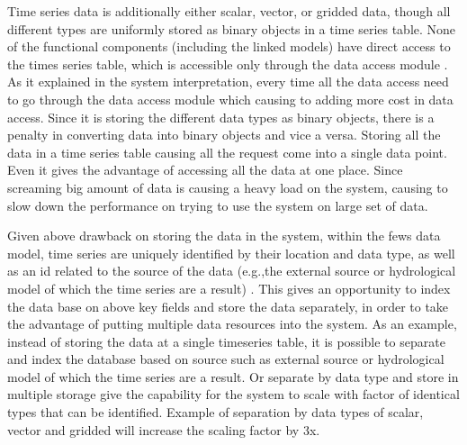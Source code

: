 Time series data is additionally either scalar, vector, or gridded data, though all different types are uniformly stored as binary objects in a time series table. None of the functional components (including the linked models) have direct access to the times series table, which is accessible only through the data access module \cite{Werner2013TheSystem}. As it explained in the system interpretation, every time all the data access need to go through the data access module which causing to adding more cost in data access. Since it is storing the different data types as binary objects, there is a penalty in converting data into binary objects and vice a versa. Storing all the data in a time series table causing all the request come into a single data point. Even it gives the advantage of accessing all the data at one place. Since screaming big amount of data is causing a heavy load on the system, causing to slow down the performance on trying to use the system on large set of data.

Given above drawback on storing the data in the system, within the \acrshort{fews} data model, time series are uniquely identified by their location and data type, as well as an id related to the source of the data (e.g.,the external source or hydrological model of which the time series are a result) \cite{Werner2013TheSystem}. This gives an opportunity to index the data base on above key fields and store the data separately, in order to take the advantage of putting multiple data resources into the system. As an example, instead of storing the data at a single timeseries table, it is possible to separate and index the database based on source such as external source or hydrological model of which the time series are a result. Or separate by data type and store in multiple storage give the capability for the system to scale with factor of identical types that can be identified. Example of separation by data types of scalar, vector and gridded will increase the scaling factor by 3x.

